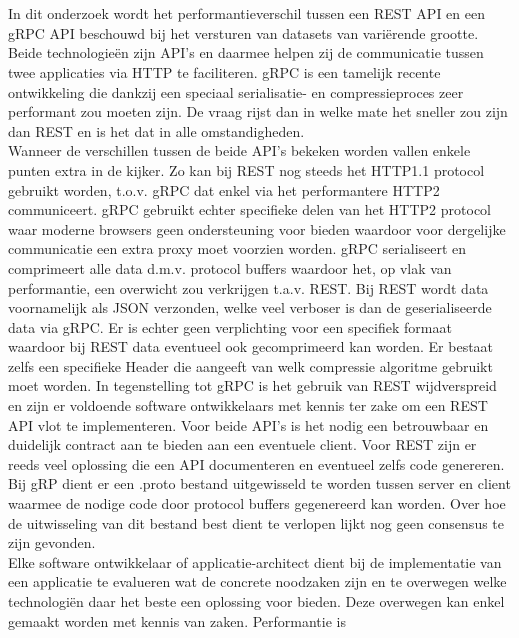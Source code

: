 \chapter*{}
In dit onderzoek wordt het performantieverschil tussen een REST API en een gRPC API beschouwd bij het versturen van datasets van variërende grootte.
Beide technologieën zijn API's en daarmee helpen zij de communicatie tussen twee applicaties via HTTP te faciliteren. gRPC is een tamelijk recente ontwikkeling die
dankzij een speciaal serialisatie- en compressieproces zeer performant zou moeten zijn. De vraag rijst dan in welke mate het sneller zou zijn dan REST en is het dat
in alle omstandigheden.\\
Wanneer de verschillen tussen de beide API's bekeken worden vallen enkele punten extra in de kijker.
Zo kan bij REST nog steeds het HTTP1.1 protocol gebruikt worden, t.o.v. gRPC dat enkel via het performantere HTTP2 communiceert.
gRPC gebruikt echter specifieke delen van het HTTP2 protocol waar moderne browsers geen ondersteuning voor bieden
waardoor voor dergelijke communicatie een extra proxy moet voorzien worden.
gRPC serialiseert en comprimeert alle data d.m.v. protocol buffers waardoor het, op vlak van performantie, een overwicht zou verkrijgen t.a.v. REST.
Bij REST wordt data voornamelijk als JSON verzonden, welke veel verboser is dan de geserialiseerde data via gRPC.
Er is echter geen verplichting voor een specifiek formaat waardoor bij REST data eventueel ook gecomprimeerd kan worden.
Er bestaat zelfs een specifieke Header die aangeeft van welk compressie algoritme gebruikt moet worden.
In tegenstelling tot gRPC is het gebruik van REST wijdverspreid en zijn er voldoende software ontwikkelaars met kennis ter zake om een REST API vlot te implementeren.
Voor beide API's is het nodig een betrouwbaar en duidelijk contract aan te bieden aan een eventuele client.
Voor REST zijn er reeds veel oplossing die een API documenteren en eventueel zelfs code genereren.
Bij gRP dient er een .proto bestand uitgewisseld te worden tussen server en client waarmee de nodige code door protocol buffers gegenereerd kan worden.
Over hoe de uitwisseling van dit bestand best dient te verlopen lijkt nog geen consensus te zijn gevonden.\\
Elke software ontwikkelaar of applicatie-architect dient bij de implementatie van een applicatie te evalueren wat de concrete noodzaken
zijn en te overwegen welke technologi\"en daar het beste een oplossing voor bieden. Deze overwegen kan enkel gemaakt worden met kennis van zaken. Performantie is
